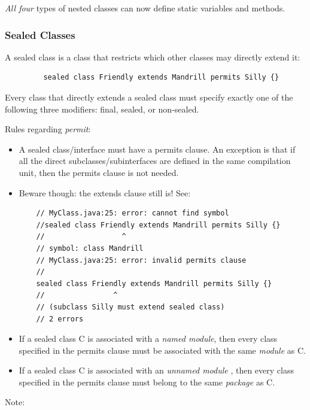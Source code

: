 \documentclass{scrartcl}
\begin{document}
    \textit{All four} types of nested classes can now define static variables and methods.

\subsubsection{Sealed Classes}

    A sealed class is a class that restricts which other classes may directly extend it:

    \begin{lstlisting}
         sealed class Friendly extends Mandrill permits Silly {}
    \end{lstlisting}


    Every class that directly extends a sealed class must specify exactly one of the following three modifiers: final, sealed, or non-­sealed.

    Rules regarding \textit{permit}:

    \begin{itemize}
        \item A sealed class/interface must have a permits clause. An exception is that if all the direct subclasses/subinterfaces are defined in the same compilation unit, then the permits clause is not needed.
        \item Beware though: the extends clause still is! See:

\begin{lstlisting}
    // MyClass.java:25: error: cannot find symbol
    //sealed class Friendly extends Mandrill permits Silly {}
    //                  ^
    // symbol: class Mandrill
    // MyClass.java:25: error: invalid permits clause
    //
    sealed class Friendly extends Mandrill permits Silly {}
    //                ^
    // (subclass Silly must extend sealed class)
    // 2 errors
\end{lstlisting}
        \item  If a sealed class C is associated with a \textit{named module}, then every class specified in the permits clause must be associated with the same \textit{module} as C.
        \item If a sealed class C is associated with an \textit{unnamed module} , then every class specified in the permits clause must belong to the same \textit{package} as C.
    \end{itemize}

    Note:
\end{document}
